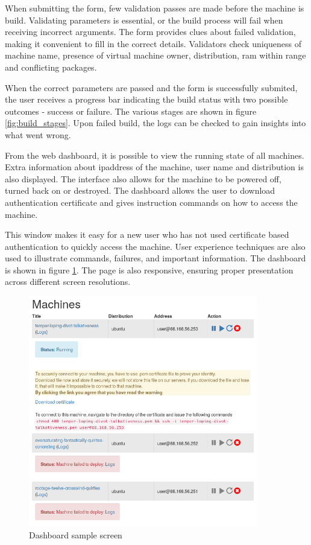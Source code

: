 \documentclass{article}
\begin{document}
When submitting the form, few validation passes are made before the machine is build. Validating parameters is essential, or the build process will fail when receiving incorrect arguments. The form provides clues about failed validation, making it convenient to fill in the correct details.
Validators check uniqueness of machine name, presence of virtual machine owner, distribution, \gls{ram} within range and conflicting packages.

When the correct parameters are passed and the form is successfully submited, the user receives a progress bar indicating the build status with two possible outcomes - success or failure. The various stages are shown in figure \ref{fig:build_stages}.
Upon failed build, the logs can be checked to gain insights into what went wrong.

From the web dashboard, it is possible to view the running state of all machines. Extra information about \gls{ipaddress} of the machine, user name and distribution is also displayed. The interface also allows for the machine to be powered off, turned back on or destroyed. The dashboard allows the user to download authentication certificate and gives instruction commands on how to access the machine.

This window makes it easy for a new user who has not used certificate based authentication to quickly access the machine. User experience techniques are also used to illustrate commands, failures, and important information. The dashboard is shown in figure \ref{fig:web-interface-dashboard}. The page is also responsive, ensuring proper presentation across different screen resolutions.

\begin{figure}[H]
	\vspace{0.5cm}
	\includegraphics[width=10cm]{dashboard}
	\vspace{0.5cm}
	\caption{Dashboard sample screen}
	\label{fig:web-interface-dashboard}
\end{figure}
\end{document}
